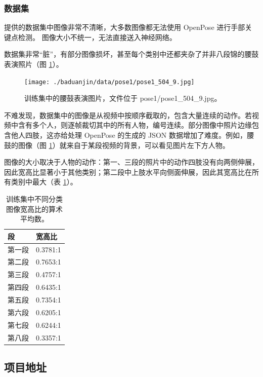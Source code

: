 \documentclass[12pt,titlepage]{article}
\begin{document}
\subsubsection{数据集}

提供的数据集中图像非常不清晰，大多数图像都无法使用 OpenPose 进行手部关键点检测。
图像大小不统一，无法直接送入神经网络。

数据集非常“脏”，有部分图像损坏，甚至每个类别中还都夹杂了并非八段锦的腰鼓表演照片（图 \ref{fig:drum}）。

\begin{figure}[h!]
  \centering
  \texttt{[image: ./baduanjin/data/pose1/pose1\_504\_9.jpg]}
  \caption{训练集中的腰鼓表演图片，文件位于 pose1/pose1\_504\_9.jpg。}
  \label{fig:drum}
\end{figure}

不难发现，数据集中的图像是从视频中按顺序截取的，包含大量连续的动作。若视频中含有多个人，则逐帧裁切其中的所有人物，编号连续。部分图像中照片边缘包含他人四肢，这亦给处理 OpenPose 的生成的 JSON 数据增加了难度。例如，腰鼓的图像（图 \ref{fig:drum}）就来自于某段视频的背景，可以看见图片左下方人物。

图像的大小取决于人物的动作：第一、三段的照片中的动作四肢没有向两侧伸展，因此宽高比显著小于其他类别；第二段中上肢水平向侧面伸展，因此其宽高比在所有类别中最大（表 \ref{tab:aspect-ratio}）。

\begin{table}[h!]
  \centering
  \begin{tabular}{|l|l|}
    \hline
    段   & 宽高比      \\
    \hline
    第一段 & 0.3781:1 \\
    第二段 & 0.7653:1 \\
    第三段 & 0.4757:1 \\
    第四段 & 0.6435:1 \\
    第五段 & 0.7354:1 \\
    第六段 & 0.6205:1 \\
    第七段 & 0.6244:1 \\
    第八段 & 0.3357:1 \\
    \hline
  \end{tabular}
  \caption{训练集中不同分类图像宽高比的算术平均数。}
  \label{tab:aspect-ratio}
\end{table}

\subsection{项目地址}
\end{document}
